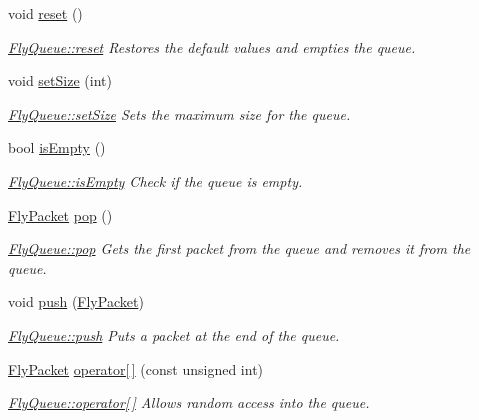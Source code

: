 \begin{DoxyCompactItemize}
void \hyperlink{class_fly_queue_ac3f3e14584bf80481cb9fc9e0c14019a}{reset} ()
\begin{DoxyCompactList}\small\item\em \hyperlink{class_fly_queue_ac3f3e14584bf80481cb9fc9e0c14019a}{Fly\+Queue\+::reset} Restores the default values and empties the queue. \end{DoxyCompactList}\item 
\hypertarget{class_fly_queue_a5ab4935882579e59c763319b0716ffa1}{}\label{class_fly_queue_a5ab4935882579e59c763319b0716ffa1} 
void \hyperlink{class_fly_queue_a5ab4935882579e59c763319b0716ffa1}{set\+Size} (int)
\begin{DoxyCompactList}\small\item\em \hyperlink{class_fly_queue_a5ab4935882579e59c763319b0716ffa1}{Fly\+Queue\+::set\+Size} Sets the maximum size for the queue. \end{DoxyCompactList}\item 
bool \hyperlink{class_fly_queue_ac866e43ea0e8e6aab10d4e2ca5f733f3}{is\+Empty} ()
\begin{DoxyCompactList}\small\item\em \hyperlink{class_fly_queue_ac866e43ea0e8e6aab10d4e2ca5f733f3}{Fly\+Queue\+::is\+Empty} Check if the queue is empty. \end{DoxyCompactList}\item 
\hyperlink{class_fly_packet}{Fly\+Packet} \hyperlink{class_fly_queue_a96b802276ccd6ce04c42da2765001603}{pop} ()
\begin{DoxyCompactList}\small\item\em \hyperlink{class_fly_queue_a96b802276ccd6ce04c42da2765001603}{Fly\+Queue\+::pop} Gets the first packet from the queue and removes it from the queue. \end{DoxyCompactList}\item 
\hypertarget{class_fly_queue_a93c9830f311b6f97d5e26fd882ef7d04}{}\label{class_fly_queue_a93c9830f311b6f97d5e26fd882ef7d04} 
void \hyperlink{class_fly_queue_a93c9830f311b6f97d5e26fd882ef7d04}{push} (\hyperlink{class_fly_packet}{Fly\+Packet})
\begin{DoxyCompactList}\small\item\em \hyperlink{class_fly_queue_a93c9830f311b6f97d5e26fd882ef7d04}{Fly\+Queue\+::push} Puts a packet at the end of the queue. \end{DoxyCompactList}\item 
\hyperlink{class_fly_packet}{Fly\+Packet} \hyperlink{class_fly_queue_a00f38b409354127748f2093d38dee7be}{operator\mbox{[}$\,$\mbox{]}} (const unsigned int)
\begin{DoxyCompactList}\small\item\em \hyperlink{class_fly_queue_a00f38b409354127748f2093d38dee7be}{Fly\+Queue\+::operator\mbox{[}$\,$\mbox{]}} Allows random access into the queue. \end{DoxyCompactList}\end{DoxyCompactItemize}


